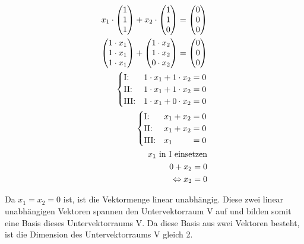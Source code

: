\begin{align*}
    x_1 \cdot \begin{pmatrix}
        1 \\ 1 \\1
    \end{pmatrix} + x_2 \cdot \begin{pmatrix}
        1 \\ 1 \\ 0
    \end{pmatrix} = \begin{pmatrix}
        0 \\ 0 \\ 0
    \end{pmatrix} \\
    \begin{pmatrix}
        1 \cdot x_1 \\ 1 \cdot x_1 \\1 \cdot x_1
    \end{pmatrix} + \begin{pmatrix}
        1 \cdot x_2 \\ 1 \cdot x_2 \\ 0 \cdot x_2
    \end{pmatrix} = \begin{pmatrix}
        0 \\ 0 \\ 0
    \end{pmatrix} \\
    \begin{cases}
        \text{I:\@} & 1 \cdot x_1 + 1 \cdot x_2 = 0 \\
        \text{II:\@} & 1 \cdot x_1 + 1 \cdot x_2 = 0 \\
        \text{III:\@} & 1 \cdot x_1 + 0 \cdot x_2 = 0
    \end{cases} \\
    \begin{cases}
        \text{I:\@} & x_1 + x_2 = 0 \\
        \text{II:\@} & x_1 + x_2 = 0 \\
        \text{III:\@} & x_1 \phantom{{} + x_2} = 0
    \end{cases} \\
    x_1 \text{ in I einsetzen} \\
    0 + x_2 = 0 \\
    \Leftrightarrow x_2 = 0
\end{align*}

Da $x_1 = x_2 = 0$ ist, ist die Vektormenge linear unabhängig. Diese zwei linear unabhängigen Vektoren spannen den Untervektorraum V auf und bilden somit eine Basis dieses Untervektorraums V. Da diese Basis aus zwei Vektoren besteht, ist die Dimension des Untervektorraums V gleich 2.